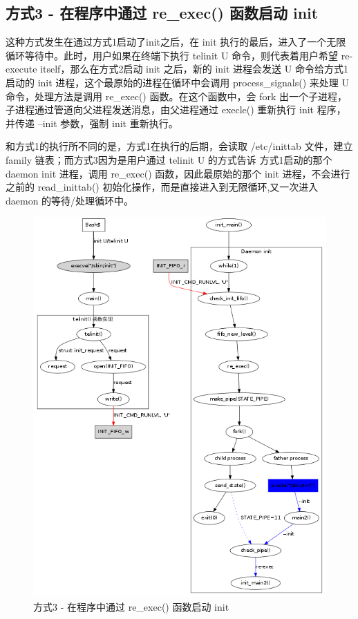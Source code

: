 \subsection{方式3 - 在程序中通过 re\_exec() 函数启动 init}

这种方式发生在通过方式1启动了init之后，在 init
执行的最后，进入了一个无限循环等待中。此时，用户如果在终端下执行 telinit U
命令，则代表着用户希望 re-execute itself，那么在方式2启动 init 之后，新的
init 进程会发送 U 命令给方式1启动的 init
进程，这个最原始的进程在循环中会调用 process\_signals() 来处理 U
命令，处理方法是调用 re\_exec() 函数。在这个函数中，会 fork
出一个子进程，子进程通过管道向父进程发送消息，由父进程通过 execle()
重新执行 init 程序，并传递 --init 参数，强制 init 重新执行。

和方式1的执行所不同的是，方式1在执行的后期，会读取 /etc/inittab 文件，建立
family 链表；而方式3因为是用户通过 telinit U 的方式告诉 方式1启动的那个
daemon init 进程，调用 re\_exec() 函数，因此最原始的那个 init
进程，不会进行之前的 read\_inittab()
初始化操作，而是直接进入到无限循环,又一次进入 daemon 的等待/处理循环中。

\begin{figure}[htbp]
\centering
\includegraphics{./figures/how-to-exec-init-3.png}
\caption{方式3 - 在程序中通过 re\_exec() 函数启动 init}
\end{figure}

